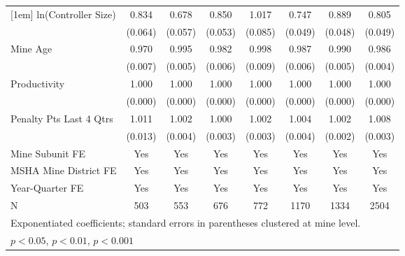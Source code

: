 {\begin{tabular}{l*{7}{c}}
[1em]
ln(Controller Size)      &       0.834\sym{*}  &       0.678\sym{***}&       0.850\sym{**} &       1.017         &       0.747\sym{***}&       0.889\sym{*}  &       0.805\sym{***}\\
                         &     (0.064)         &     (0.057)         &     (0.053)         &     (0.085)         &     (0.049)         &     (0.048)         &     (0.049)         \\
[1em]
Mine Age                 &       0.970\sym{***}&       0.995         &       0.982\sym{**} &       0.998         &       0.987\sym{*}  &       0.990         &       0.986\sym{**} \\
                         &     (0.007)         &     (0.005)         &     (0.006)         &     (0.009)         &     (0.006)         &     (0.005)         &     (0.004)         \\
[1em]
Productivity             &       1.000         &       1.000         &       1.000\sym{**} &       1.000         &       1.000         &       1.000\sym{*}  &       1.000         \\
                         &     (0.000)         &     (0.000)         &     (0.000)         &     (0.000)         &     (0.000)         &     (0.000)         &     (0.000)         \\
[1em]
Penalty Pts Last 4 Qtrs  &       1.011         &       1.002         &       1.000         &       1.002         &       1.004         &       1.002         &       1.008\sym{*}  \\
                         &     (0.013)         &     (0.004)         &     (0.003)         &     (0.003)         &     (0.004)         &     (0.002)         &     (0.003)         \\
[1em]
Mine Subunit FE          &         Yes         &         Yes         &         Yes         &         Yes         &         Yes         &         Yes         &         Yes         \\
[1em]
MSHA Mine District FE    &         Yes         &         Yes         &         Yes         &         Yes         &         Yes         &         Yes         &         Yes         \\
[1em]
Year-Quarter FE          &         Yes         &         Yes         &         Yes         &         Yes         &         Yes         &         Yes         &         Yes         \\
\hline
N                        &         503         &         553         &         676         &         772         &        1170         &        1334         &        2504         \\
\hline\hline
\multicolumn{8}{l}{\footnotesize Exponentiated coefficients; standard errors in parentheses clustered at mine level.}\\
\multicolumn{8}{l}{\footnotesize \sym{*} \(p<0.05\), \sym{**} \(p<0.01\), \sym{***} \(p<0.001\)}\\
\end{tabular}
}
